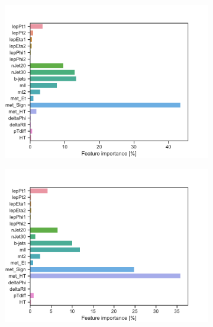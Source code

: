 \begin{figure}[H]
\begin{subfigure}[t!]{0.49\textwidth}
        \includegraphics[width = \textwidth]{Figures/WW/BDT/All_level/High/featureImportance.pdf}
        \caption{}
        \label{fig:featWWLow}
    \end{subfigure}
    \begin{subfigure}[t!]{0.49\textwidth}
        \includegraphics[width = \textwidth]{Figures/Mono_Z/ML/BDT/All_level/High/featureImportance.pdf}
        \caption{}
        \label{fig:featMonoZLow}
    \end{subfigure}
    \caption{}
    \label{fig:resExample}
\end{figure}



